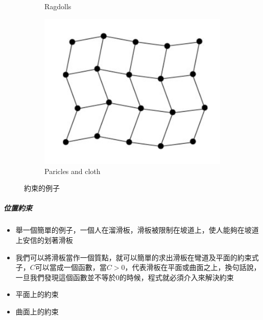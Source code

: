 \begin{figure}[h]
\begin{subfigure}[b]{0.3\linewidth}
    \caption{Ragdolls}
    \end{subfigure}
    \begin{subfigure}[b]{0.3\linewidth}
    \includegraphics[width=\linewidth]{./resources/physics/PariclesCloth.png}
    \caption{Paricles and cloth}
    \end{subfigure}
\caption{約束的例子}
\label{fig:constraint_ex}
\end{figure}



\newpage

\subparagraph{位置約束}
\begin{itemize}
    \item{舉一個簡單的例子，一個人在溜滑板，滑板被限制在坡道上，使人能夠在坡道上安信的划著滑板}
    \item{我們可以將滑板當作一個質點，就可以簡單的求出滑板在彎道及平面的約束式子，$C$可以當成一個函數，當$C > 0$，代表滑板在平面或曲面之上，換句話說，一旦我們發現這個函數並不等於0的時候，程式就必須介入來解決約束}
    \item{平面上的約束}
    \item{曲面上的約束}
\end{itemize}

